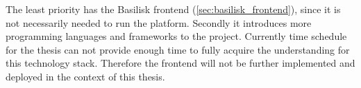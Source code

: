 The least priority has the Basilisk frontend (\ref{sec:basilisk_frontend}), since it is not necessarily needed to run the platform.
Secondly it introduces more programming languages and frameworks to the project.
Currently time schedule for the thesis can not provide enough time to fully acquire the understanding for this technology stack.
Therefore the frontend will not be further implemented and deployed in the context of this thesis.














	